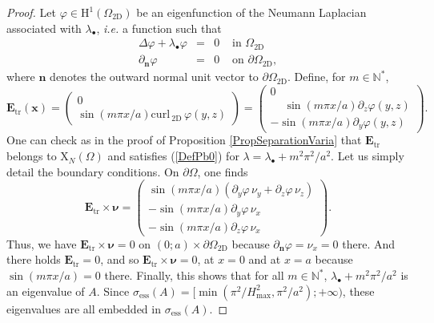 \documentclass[11pt,a4paper]{article}
\newcommand{\Om}{\Omega}
\newcommand{\mrm}[1]{\mathrm{#1}}
\newcommand{\bfx}{\boldsymbol{x}}
\newcommand{\bfnu}{\boldsymbol{\nu}}
\newcommand{\N}{\mathbb{N}}
\newcommand{\mH}{\mrm{H}}
\newcommand{\mX}{\mrm{X}}
\newcommand{\curlvec}{\boldsymbol{\mrm{curl}}\,}
\def\E{\boldsymbol{E}}
\begin{document}
\begin{proof}
Let $\varphi\in\mH^1(\Om_{\mrm{2D}})$ be an eigenfunction 
of the Neumann Laplacian associated with $\lambda_\bullet$, \textit{i.e.} a function such that
\[
\begin{array}{|rcll}
\Delta\varphi+\lambda_\bullet\varphi&=&0&\mbox{ in }\Om_{\mrm{2D}}\\[2pt]
\partial_{\boldsymbol{n}}\varphi&=&0& \mbox{ on }\partial\Om_{\mrm{2D}},
\end{array}
\]
where $\boldsymbol{n}$ denotes the outward normal unit vector to $\partial\Om_{\mrm{2D}}$. Define, for $m\in\N^\ast$,
\[
\E_{\mrm{tr}}(\bfx)=\left(\begin{array}{c}
0\\
\sin(m\pi x/a)\curlvec_{\mrm{2D}}\,\varphi(y,z)
\end{array}\right)=\left(\begin{array}{c}
0\\
\phantom{-}\sin(m\pi x/a)\partial_z\varphi(y,z)\\
-\sin(m\pi x/a)\partial_y\varphi(y,z)
\end{array}\right).
\]
One can check as in the proof of Proposition \ref{PropSeparationVaria} that $\E_{\mrm{tr}}$ belongs to $\boldsymbol{\mX}_N(\Om)$ and satisfies (\ref{DefPb0}) for $\lambda=\lambda_{\bullet}+m^2\pi^2/a^2$. Let us simply detail the boundary conditions. On $\partial\Om$, one finds
\[
\E_{\mrm{tr}}\times\bfnu=\left(\begin{array}{c}
\sin(m\pi x/a)(\partial_y\varphi\,\nu_y+\partial_z\varphi\,\nu_z)\\
-\sin(m\pi x/a)\partial_y\varphi\,\nu_x\\
-\sin(m\pi x/a)\partial_z\varphi\,\nu_x
\end{array}\right).
\]
Thus, we have $\E_{\mrm{tr}}\times\bfnu=0$ on $(0;a)\times\partial\Om_{\mrm{2D}}$ because $\partial_{\boldsymbol{n}}\varphi=\nu_x=0$ there. And there holds $\E_{\mrm{tr}}=0$, and so $\E_{\mrm{tr}}\times\bfnu=0$, at $x=0$ and at $x=a$ because $\sin(m\pi x/a)=0$ there. Finally, this shows that for all $m\in\N^\ast$, $\lambda_{\bullet}+m^2\pi^2/a^2$ is an eigenvalue of $A$. Since $\sigma_{\mrm{ess}}(A)=[\min(\pi^2/H^2_\mrm{max},\pi^2/a^2);+\infty)$, these eigenvalues are all embedded in $\sigma_{\mrm{ess}}(A)$.
\end{proof}
\end{document}
